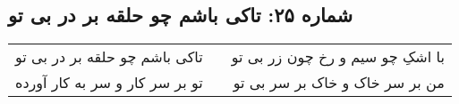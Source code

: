 \begin{center}
\section*{شماره ۲۵: تاکی باشم چو حلقه بر در بی تو}
\label{sec:025}
\begin{longtable}{l p{0.5cm} r}
تاکی باشم چو حلقه بر در بی تو
&&
با اشکِ چو سیم و رخ چون زر بی تو
\\
تو بر سر کار و سر به کار آورده
&&
من بر سر خاک و خاک بر سر بی تو
\\
\end{longtable}
\end{center}
